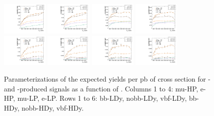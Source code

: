 \begin{figure}[htbp]
  \includegraphics[width=0.2\textwidth]{fig/analysisAppendix/paramSignalYield_NonVBFSig_mu_HP_nobb_HDy.pdf}
  \includegraphics[width=0.2\textwidth]{fig/analysisAppendix/paramSignalYield_NonVBFSig_e_HP_nobb_HDy.pdf}
  \includegraphics[width=0.2\textwidth]{fig/analysisAppendix/paramSignalYield_NonVBFSig_mu_LP_nobb_HDy.pdf}
  \includegraphics[width=0.2\textwidth]{fig/analysisAppendix/paramSignalYield_NonVBFSig_e_LP_nobb_HDy.pdf}\\
  \includegraphics[width=0.2\textwidth]{fig/analysisAppendix/paramSignalYield_NonVBFSig_mu_HP_vbf_HDy.pdf}
  \includegraphics[width=0.2\textwidth]{fig/analysisAppendix/paramSignalYield_NonVBFSig_e_HP_vbf_HDy.pdf}
  \includegraphics[width=0.2\textwidth]{fig/analysisAppendix/paramSignalYield_NonVBFSig_mu_LP_vbf_HDy.pdf}
  \includegraphics[width=0.2\textwidth]{fig/analysisAppendix/paramSignalYield_NonVBFSig_e_LP_vbf_HDy.pdf}\\
  \caption{
    Parameterizations of the expected yields per pb of cross section for \ggF- and \DY-produced signals as a function of \MX.
    Columns 1 to 4: mu-HP, e-HP, mu-LP, e-LP.
    Rows 1 to 6: bb-LDy, nobb-LDy, vbf-LDy, bb-HDy, nobb-HDy, vbf-HDy.
  }
  \label{fig:YieldParam_NonVBF_Run2}
\end{figure}

